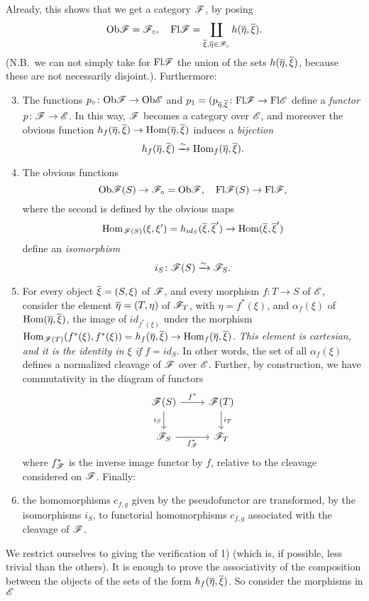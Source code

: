 Already, this shows that we get a category $\mathscr{F}$, by posing
\[\mathrm{Ob} \mathscr{F} = \mathscr{F}_\circ, \quad \mathrm{Fl} \mathscr{F} = \coprod_{\overline \xi, \overline \eta \in \mathscr{F}_\circ} h(\overline \eta, \overline \xi).\]
(N.B.\ we can not simply take for $\mathrm{Fl} \mathscr{F}$ the union of the sets $h (\overline \eta, \overline \xi)$, because these are not necessarily disjoint.).
Furthermore:
\begin{enumerate}
    \setcounter{enumi}{2}
    \item The functions $p_\circ \colon \mathrm{Ob} \mathscr{F} \to \mathrm{Ob} \mathscr{E}$ and $p_1 = (p_{\overline \eta, \overline \xi} \colon \mathrm{Fl}\mathscr{F} \to \mathrm{Fl} \mathscr{E}$ define a \emph{functor} $p \colon \mathscr{F} \to \mathscr{E}$. In this way, $\mathscr{F}$ becomes a category over $\mathscr{E}$, and moreover the obvious function $h_f (\overline \eta, \overline \xi) \to \mathrm{Hom} (\overline \eta, \overline \xi)$ induces a \emph{bijection}
    \[h_f(\overline \eta, \overline \xi) \xrightarrow{\sim} \mathrm{Hom}_f(\overline \eta, \overline \xi).\]
    \item The obvious functions
    \[\mathrm{Ob} \mathscr{F}(S) \to \mathscr{F}_\circ = \mathrm{Ob} \mathscr{F}, \quad \mathrm{Fl} \mathscr{F}(S) \to \mathrm{Fl}\mathscr{F},\]
    where the second is defined by the obvious maps
    \[\mathrm{Hom}_{\mathscr{F}(S)} (\xi, \xi') = h_{id_S}(\overline \xi,\overline \xi') \to \mathrm{Hom}(\overline \xi, \overline \xi')\]
    define an \emph{isomorphism}
    \[i_S \colon \mathscr{F}(S) \xrightarrow{\sim} \mathscr{F}_S.\]
    \item For every object $\overline \xi = (S, \xi)$ of $\mathscr{F}$, and every morphism $f \colon T \to S$ of $\mathscr{E}$, consider the element $\overline \eta = (T, \eta)$ of $\mathscr{F}_T$, 
    with $\eta = f^\ast (\xi)$, and $\alpha_f (\xi)$ of $\mathrm{Hom} (\overline \eta, \overline \xi)$, the image of $id_{f^\ast (\xi)}$ under the morphism $\mathrm{Hom}_{\mathscr{F} (T)} (f^\ast(\xi), f ^\ast(\xi)) = h_f (\overline \eta, \overline \xi) \to \mathrm{Hom}_f (\overline \eta, \overline \xi)$.
    \emph{This element is cartesian, and it is the identity in $\xi$ if $f = id_S$}.
    In other words, the set of all $\alpha_f (\xi)$ defines a normalized cleavage of $\mathscr{F}$ over $\mathscr{E}$. 
    Further, by construction, we have commutativity in the diagram of functors
    \[
    \begin{tikzcd}
        \F(S)
        \arrow[r, "f^\ast"]
        \arrow[d, "i_S", swap]
        &
        \F(T)
        \arrow[d, "i_T"]
        \\
        \F_S
        \arrow[r, "f^\ast_\F", swap]
        &
        \F_T
    \end{tikzcd}\]
    where $f^\ast_{\mathscr{F}}$ is the inverse image functor by $f$, relative to the cleavage considered on $\mathscr{F}$. Finally:
    \item the homomorphisms $c_{f, g}$ given by the pseudofunctor are transformed, by the isomorphisms $i_S$, to functorial homomorphisms $c_{f, g}$ associated with the cleavage of $\mathscr{F}$.
\end{enumerate}
We restrict ourselves to giving the verification of 1) (which is, if possible, less trivial than the others). It is enough to prove the associativity of the composition between the objects of the sets of the form $h_f (\overline \eta, \overline \xi)$. So consider the morphisms in $\mathscr{E}$
